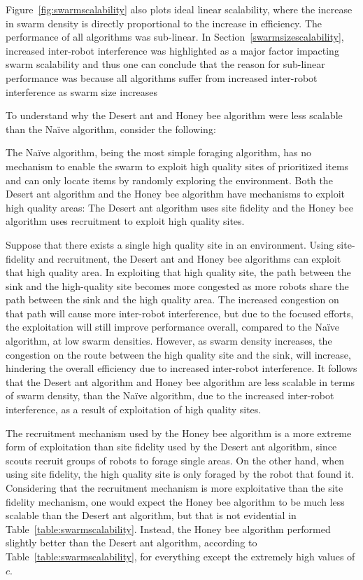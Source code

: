 Figure~\ref{fig:swarmscalability} also plots ideal linear scalability, where the increase in swarm density is directly proportional to the increase in efficiency. The performance of all algorithms was sub-linear. In Section~\ref{swarmsizescalability}, increased inter-robot interference was highlighted as a major factor impacting swarm scalability and thus one can conclude that the reason for sub-linear performance was because all algorithms suffer from increased inter-robot interference as swarm size increases

To understand why the Desert ant and Honey bee algorithm were less scalable than the Na\"ive algorithm, consider the following:

The Na\"ive algorithm, being the most simple foraging algorithm, has no mechanism to enable the swarm to exploit high quality sites of prioritized items and can only locate items by randomly exploring the environment. Both the Desert ant algorithm and the Honey bee algorithm have mechanisms to exploit high quality areas: The Desert ant algorithm uses site fidelity and the Honey bee algorithm uses recruitment to exploit high quality sites. 

Suppose that there exists a single high quality site in an environment. Using site-fidelity and recruitment, the Desert ant and Honey bee algorithms can exploit that high quality area. In exploiting that high quality site, the path between the sink and the high-quality site becomes more congested as more robots share the path between the sink and the high quality area. The increased congestion on that path will cause more inter-robot interference, but due to the focused efforts, the exploitation will still improve performance overall, compared to the Na\"ive algorithm, at low swarm densities. However, as swarm density increases, the congestion on the route between the high quality site and the sink, will increase, hindering the overall efficiency due to increased inter-robot interference. It follows that the Desert ant algorithm and Honey bee algorithm are less scalable in terms of swarm density, than the Na\"ive algorithm, due to the increased inter-robot interference, as a result of exploitation of high quality sites.

The recruitment mechanism used by the Honey bee algorithm is a more extreme form of exploitation than site fidelity used by the Desert ant algorithm, since scouts recruit groups of robots to forage single areas. On the other hand, when using site fidelity, the high quality site is only foraged by the robot that found it. Considering that the recruitment mechanism is more exploitative than the site fidelity mechanism, one would expect the Honey bee algorithm to be much less scalable than the Desert ant algorithm, but that is not evidential in Table~\ref{table:swarmscalability}. Instead, the Honey bee algorithm performed slightly better than the Desert ant algorithm, according to Table~\ref{table:swarmscalability}, for everything except the extremely high values of $c$. 


